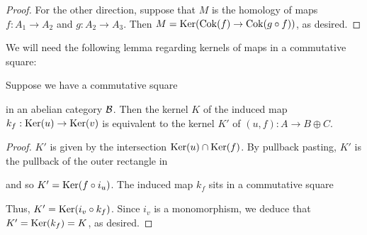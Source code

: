 \begin{proof}
  For the other direction, suppose that $M$ is the homology of maps $f : A_1 \to A_2$ and $g : A_2 \to A_3$.
  Then $M = \operatorname{Ker} (\operatorname{Cok} (f) \to \operatorname{Cok}(g \circ f))$, as desired.
\end{proof}

We will need the following lemma regarding kernels of maps in a commutative square:

\begin{lemma}\label{lem:diff-ker-is-ker}
  Suppose we have a commutative square
  \begin{center}
  \end{center}
  in an abelian category $\mathcal{B}$.
  Then the kernel $K$ of the induced map $k_f : \operatorname{Ker}(u) \rightarrow \operatorname{Ker}(v)$ is equivalent to the kernel $K'$ of $(u, f) : A \to B \oplus C$.
\end{lemma}

\begin{proof}
  $K'$ is given by the intersection $\operatorname{Ker}(u) \cap \operatorname{Ker}(f)$.
  By pullback pasting, $K'$ is the pullback of the outer rectangle in
  \begin{center}
  \end{center}
  and so $K' = \operatorname{Ker}(f \circ i_u)$.
  The induced map $k_f$ sits in a commutative square
    \begin{center}
    \end{center}
  Thus, $K' = \operatorname{Ker}(i_v \circ k_f)$.
  Since $i_v$ is a monomorphism, we deduce that $K' = \operatorname{Ker}(k_f) = K$, as desired.
\end{proof}

